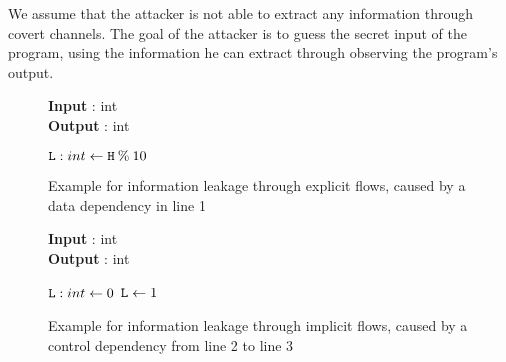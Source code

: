 We assume that the attacker is not able to extract any information through covert channels. The goal of the attacker is to guess the secret input of the program, using the information he can extract through observing the program's output.



\begin{figure}
    \centering
    \begin{minipage}{.7\linewidth}
        \begin{algorithm}[H]
            \hspace*{\algorithmicindent} \textbf{Input} \In: int \\
            \hspace*{\algorithmicindent} \textbf{Output} \Out: int
            \hspace*{1em}
            \begin{algorithmic}[1]
                \State $\mathtt{L}: int \leftarrow \mathtt{H} \: \% \: 10$
            \end{algorithmic} 
        \end{algorithm}
\end{minipage}
\caption{Example for information leakage through explicit flows, caused by a data dependency in line 1}
\label{fig:exEx}
\end{figure}

\begin{figure}
    \centering
    \begin{minipage}{.7\linewidth}
        \begin{algorithm}[H]
            \hspace*{\algorithmicindent} \textbf{Input} \In: int \\
            \hspace*{\algorithmicindent} \textbf{Output} \Out: int
            \hspace*{1em}
            \begin{algorithmic}[1]
                \State $\mathtt{L}: int \leftarrow 0$
                \State $\mathtt{L} \leftarrow 1$
                \EndIf
            \end{algorithmic} 
        \end{algorithm}
\end{minipage}
\caption{Example for information leakage through implicit flows, caused by a control dependency from line 2 to line 3}
\label{fig:ifEx}
\end{figure}

